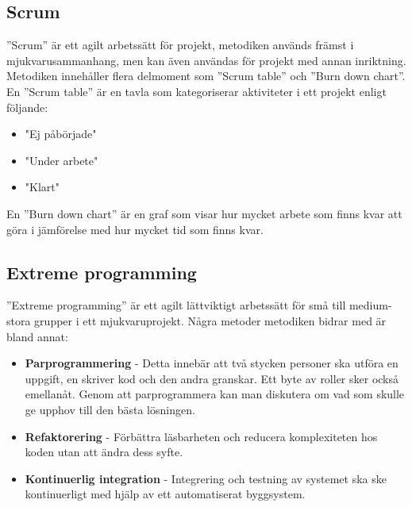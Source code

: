 \subsection{Scrum}
''Scrum'' är ett agilt arbetssätt för projekt, metodiken används främst i mjukvarusammanhang, men kan även användas för projekt med annan inriktning. Metodiken innehåller flera delmoment som ''Scrum table'' och ''Burn down chart''. En ''Scrum table'' är en tavla som kategoriserar aktiviteter i ett projekt enligt följande: 
\begin{itemize}
  \item "Ej påbörjade"
  \item "Under arbete"
  \item "Klart"
\end{itemize} 
En ''Burn down chart'' är en graf som visar hur mycket arbete som finns kvar att göra i jämförelse med hur mycket tid som finns kvar. \citep{scrum}

\subsection{Extreme programming}
''Extreme programming'' är ett agilt lättviktigt arbetssätt för små till medium-stora grupper i ett mjukvaruprojekt. Några metoder metodiken bidrar med är bland annat:     
\begin{itemize}
\item \textbf{Parprogrammering} - Detta innebär att två stycken personer ska utföra en uppgift, en skriver kod och den andra granskar. Ett byte av roller sker också emellanåt. Genom att parprogrammera kan man diskutera om vad som skulle ge upphov till den bästa lösningen. 
\item \textbf{Refaktorering} - Förbättra läsbarheten och reducera komplexiteten hos koden utan att ändra dess syfte.
\item \textbf{Kontinuerlig integration} - Integrering och testning av systemet ska ske kontinuerligt med hjälp av ett automatiserat byggsystem. 
\end{itemize}
\citep{kristiansandahl}
